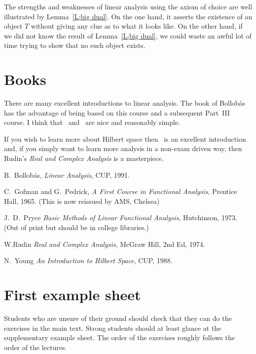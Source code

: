 The strengths and weaknesses of linear analysis
using the axiom of choice are well illustrated
by Lemma~\ref{L;big dual}. On the one hand, it asserts
the existence of an object $T$ without giving any clue
as to what it looks like. On the other hand, if we
did not know the result of Lemma~\ref{L;big dual},
we could waste an awful lot of time trying to show
that no such object exists.
\section{Books} There are many excellent introductions
to linear analysis. The book of Bollob\'as~\cite{Bolobas}
has the advantage of being based on this course and
a subsequent Part~III course. I think that~\cite{Pryce}
and~\cite{Gofman} are nice and reasonably simple.

If you wish to learn more about Hilbert space then~\cite{Young}
is an  excellent introduction and, if you simply want
to learn more analysis in a non-exam driven way, then
Rudin's \emph{Real and Complex Analysis} is a masterpiece. 
\begin{thebibliography}{9}
 B.~Bollob\'as, 
\emph{Linear Analysis}, CUP, 1991.

 C.~Gofman and G.~Pedrick,
\emph{A First Course in Functional Analysis},
Prentice Hall, 1965. (This is now reissued by
AMS, Chelsea)

J.~D.~Pryce 
\emph{Basic Methods of Linear Functional Analysis}, 
Hutchinson, 1973. (Out of print but should be
in college libraries.)


 W.Rudin \emph{Real and Complex Analysis}, McGraw Hill, 2nd Ed, 1974.

 N.~Young \emph{An Introduction to Hilbert Space},
CUP, 1988.
\end{thebibliography}

\section{First example sheet} 
Students who are unsure of  their ground should
check that they can do the exercises in the main text. 
Strong students should at least glance at the supplementary
example sheet. The order of the exercises roughly follows the
order of the lectures.


